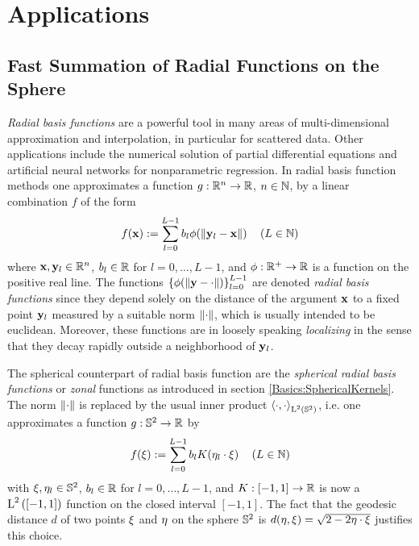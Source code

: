 \chapter{Applications}
\label{Applications}

\section{Fast Summation of Radial Functions on the Sphere}
\label{Applications:FastSum}
\emph{Radial basis functions} are a powerful tool in many areas of multi-dimensional 
approximation and interpolation, in particular for scattered data. Other applications
include the numerical solution of partial differential equations and artificial neural networks 
for nonparametric regression.
In radial basis function methods one approximates a function $g: \mathbb{R}^n
\rightarrow \mathbb{R}$, $n \in \mathbb{N}$, by a linear combination $f$ of the form
\begin{equation}
  \nonumber
  f{\hspace{-0.4ex}}\left(\mathbf{x}\right) := \sum_{l=0}^{L-1} b_{l} \phi{\hspace{-0.4ex}}\left(\left\|\mathbf{y}_{l}-\mathbf{x}\right\|\right) \quad \left(L \in \mathbb{N}\right)
\end{equation}
where $\mathbf{x}, \mathbf{y}_{l} \in \mathbb{R}^n$, $b_{l} \in \mathbb{R}$ for $l = 0,\ldots,L-1$, and 
$\phi: \mathbb{R}^{+} \rightarrow \mathbb{R}$ is a function on the positive real line. 
The functions $\left\{\phi{\hspace{-0.4ex}}\left(\left\|\mathbf{y}-\cdot\right\|\right)\right\rbrace_{l=0}^{L-1}$ are
denoted \emph{radial basis functions} since they depend solely on 
the distance of the argument $\mathbf{x}$ to a fixed point $\mathbf{y}_{l}$ measured 
by a suitable norm $\left\|\cdot\right\|$, which is usually intended to be euclidean.
Moreover, these functions are in loosely speaking \emph{localizing} in the sense 
that they decay rapidly outside a neighborhood of $\mathbf{y}_{l}$.

The spherical counterpart of radial basis function are the \emph{spherical radial basis functions} or \emph{zonal} functions as introduced in section 
\ref{Basics:SphericalKernels}. The norm $\left\|\cdot\right\|$ is replaced by the usual
inner product $\left<\cdot,\cdot\right>_{\text{\rm{L}}^{2}\left(\mathbb{S}^2\right)}$, i.e. one
approximates a function $g: \mathbb{S}^2 \rightarrow \mathbb{R}$ by
\begin{equation}
  \label{Applications:ZonalSum}
  f{\hspace{-0.4ex}}\left(\mathbf{\xi}\right) := \sum_{l=0}^{L-1} b_{l} K{\hspace{-0.4ex}}\left(\mathbf{\eta}_{l}\cdot\mathbf{\xi}\right) \quad \left(L \in \mathbb{N}\right)
\end{equation}
with $\mathbf{\xi}, \mathbf{\eta}_{l} \in \mathbb{S}^2$, $b_{l} \in \mathbb{R}$ for $l=0,\ldots,L-1$, and 
$K: [-1,1] \rightarrow \mathbb{R}$ is now a $\text{\rm{L}}^{2}\left([-1,1]\right)$ function on the closed interval $[-1,1]$. 
The fact that the geodesic distance $d$ of two points $\mathbf{\xi}$ and $\mathbf{\eta}$ on the 
sphere $\mathbb{S}^2$ is $d{\hspace{-0.4ex}}\left(\mathbf{\eta},\mathbf{\xi}\right) = 
\sqrt{2-2\mathbf{\eta}\cdot\mathbf{\xi}}$ justifies this choice.

